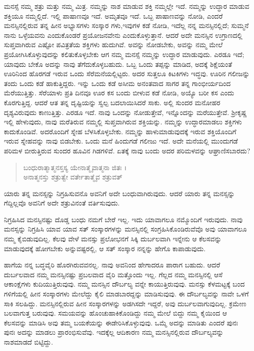ಮನಸ್ಸೆ ನಮ್ಮ ಶತ್ರು ಮತ್ತು ನಮ್ಮ ಮಿತ್ರ. ನಮ್ಮನ್ನು ನಾಶ ಮಾಡುವ ಶಕ್ತಿ ನಮ್ಮಲ್ಲೇ ಇದೆ. ನಮ್ಮನ್ನು ಉದ್ಧಾರ ಮಾಡುವ ಶಕ್ತಿಯೂ ನಮ್ಮಲ್ಲಿದೆ. ಇಲ್ಲಿ ಪಾಷಾಣವೂ ಇದೆ. ಅಮೃತವೂ ಇದೆ. ಒಬ್ಬ ಪಾಷಾಣವನ್ನು ನೋಡಿ, ಎಂದರೆ ಮನಸ್ಸಿನಲ್ಲಿರುವ ತನ್ನ ಹೀನ ಅಭ್ಯಾಸಗಳು ಸಂಸ್ಕಾರ ಗಳು,ಇವುಗಳ ಕಡೆ ನೋಡಿ, ಇದೆಲ್ಲ ನನ್ನ ಮನಸ್ಸಿನಲ್ಲಿದೆ; ಸುಮ್ಮನೆ ನಾನು ಒಳ್ಳೆಯವನು ಎಂದುಕೊಂಡರೆ ಪ್ರಯೋಜನವೇನು ಎಂದುಕೊಳ್ಳುತ್ತಾನೆ. ಆದರೆ ಅದೇ ಮನಸ್ಸಿನ ಉಗ್ರಾಣದಲ್ಲಿ ಸುಪ್ತವಾಗಿರುವ ಎಷ್ಟೋ ಪವಿತ್ರತೆಯ ಶಕ್ತಿಗಳು ಹುದುಗಿವೆ. ಅವನ್ನು ನೋಡಬೇಕು, ಅವನ್ನು ನಮ್ಮ ಮೇಲೆ ಪ್ರಯೋಗಿಸಿಕೊಳ್ಳುವುದನ್ನು ಕಲಿತುಕೊಳ್ಳಬೇಕು ಆಗ ನಮ್ಮ ಮನಸ್ಸೆ ನಮ್ಮನ್ನು ಉದ್ಧಾರ ಮಾಡುವುದು. ಎರಡೂ ಇದೆ; ಯಾವುದು ಬೇಕೊ ಅದನ್ನು ನಾವು ತೆಗೆದುಕೊಳ್ಳಬಹುದು. ಒಬ್ಬ ಒಂದು ತಪ್ಪನ್ನು ಮಾಡಿದ, ಅದಕ್ಕೆ ಶಿಕ್ಷೆಯಂತೆ ಊರಿನಿಂದ ಹೊರಗಡೆ ಇರುವ ಒಂದು ಸೆರೆಮನೆಯಲ್ಲಿಟ್ಟರು. ಅದರ ಸುತ್ತಲೂ ಕಿಟಕಿಗಳು ಇದ್ಧವು. ಊರಿನ ಗಲೀಜನ್ನು ತಂದು ಒಂದು ಕಡೆ ಹಾಕುತ್ತಿದ್ದರು. ಇನ್ನು ಒಂದು ಕಡೆ ಅಸೀಮ ಅನಂತವಾದ ಸಾಗರ ತನ್ನ ಗಾಂಭೀರ್ಯದಿಂದ ಮೆರೆಯುತ್ತಿತ್ತು. ಸೆರೆಯಾಳು ಪ್ರತಿ ದಿನವೂ ಊರ ಕಸ ಬಂದು ಬೀಳುವ ಕಡೆ ನೋಡಿ, ಅಯ್ಯೊ ಬರೀ ಕಸ ಎಂದು ಕೊರಗುತ್ತಿದ್ದ. ಆದರೆ ಆತ ತನ್ನ ದೃಷ್ಟಿಯನ್ನು ಸ್ವಲ್ಪ ಬದಲಾಯಿಸಿದರೆ ಸಾಕು. ಅಲ್ಲಿ ಸುಂದರ ಮನೋಹರ ದೃಶ್ಯವಿರುವುದು ಕಾಣುತ್ತಿತ್ತು. ಎರಡೂ ಇದೆ. ನಾವು ಒಂದನ್ನು ನೋಡುತ್ತೇವೆ, ಇನ್ನೊಂದನ್ನು ಮರೆಯುತ್ತೇವೆ. ಶ್ರೀಕೃಷ್ಣ ಇಲ್ಲಿ ಹೇಳುವುದು, ನಾವು ಮರೆತಿರುವ ನಮ್ಮಲ್ಲಿ ಸುಪ್ತವಾಗಿರುವ ಶಕ್ತಿಯನ್ನು. ನಮ್ಮನ್ನು ಉದ್ಧಾರಮಾಡಲು ಶಕ್ತಿಗಳು ಕಾದುಕೊಂಡಿವೆ. ಅದರೊಂದಿಗೆ ಸ್ನೇಹ ಬೆಳಸಿಕೊಳ್ಳಬೇಕು. ನಮ್ಮನ್ನು ಹಾಳುಮಾಡುವುದಕ್ಕೆ ಇರುವ ಶಕ್ತಿಯೊಂದಿಗೆ ಇರುವ ಸ್ನೇಹವನ್ನು ನಾವು ಬಿಡಬೇಕು. ಒಂದು ಮನೆ ಹಿಂದುಗಡೆ ಗಲೀಜು ಇದೆ. ಅದೇ ಮನೆಯಲ್ಲಿ ಮುಂದುಗಡೆ ಪರಿಮಳ ಬೀರುತ್ತಿರುವ ಸುಂದರ ಹೂವಿನ ಗಿಡಗಳಿವೆ. ಏತಕ್ಕೆ ನಾವು ಬಂದು ಅದರ ಪರಿಮಳವನ್ನು ಆಘ್ರಾಣಿಸಬಾರದು?

\begin{verse}
ಬಂಧುರಾತ್ಮಾತ್ಮನಸ್ತಸ್ಯ ಯೇನಾತ್ಮೈವಾತ್ಮನಾ ಜಿತಃ ।\\ಅನಾತ್ಮನಸ್ತು ಶತ್ರುತ್ವೇ ವರ್ತೇತಾತ್ಮೈವ ಶತ್ರುವತ್ 
\end{verse}

{\small ಯಾರು ತನ್ನ ಮನಸ್ಸನ್ನು ನಿಗ್ರಹಿಸುವನೊ ಅವನಿಗೆ ಅದೇ ಬಂಧುವಾಗಿರುವುದು. ಆದರೆ ಯಾರು ತನ್ನ ಮನಸ್ಸನ್ನು ಗೆದ್ದಿಲ್ಲವೊ ಅವನಿಗೆ ಅದೇ ಶತ್ರುವಿನಂತೆ ವರ್ತಿಸುವುದು.}

ನಿಗ್ರಹಿಸಿದ ಮನಸ್ಸಿನಷ್ಟು ದೊಡ್ಡ ಬಂಧು ನಮಗೆ ಬೇರೆ ಇಲ್ಲ. ಇದು ಯಾವಾಗಲೂ ನಮ್ಮೊಂದಿಗೆ ಇರುವುದು. ನಾವು ಮನಸ್ಸನ್ನು ನಿಗ್ರಹಿಸಿ ಯಾವ ಯಾವ ಸತ್ ಸಂಸ್ಕಾರಗಳನ್ನು ಮನಸ್ಸಿನಲ್ಲಿ ಸಂಗ್ರಹಿಸಿಕೊಂಡಿರುವೆವೊ ಅವು ಯಾವಾಗಲೂ ನಮ್ಮ ಕೈಬಿಡುವುದಿಲ್ಲ. ಕೆಲವು ವೇಳೆ ಮನಸ್ಸು ಪ್ರಲೋಭನಗೆ ಸಿಕ್ಕಿ ದುರ್ಬಲವಾಗಿ ಇನ್ನೇನು ಆ ಕೆಲಸವನ್ನು ಮಾಡುವುದಕ್ಕೆ ಹೋಗಬೇಕು ಅನ್ನುವಷ್ಟರಲ್ಲಿ, ಆ ಸತ್ ಸಂಸ್ಕಾರ ನನ್ನನ್ನು ಹೇಗೊ ಕಾಪಾಡುವುದು.

ಹಾಗೆಯ ನನ್ನ ಬದ್ಧವೈರಿ ಹೊರಗಿರುವವನಲ್ಲ. ನಾವು ಅವನಿಂದ ಹೇಗಾದರೂ ಪಾರಾಗ ಬಹುದು. ಆದರೆ ದುರ್ಬಲವಾದ ನಮ್ಮ ಮನಸ್ಸಿನಷ್ಟು ಪ್ರಬಲವಾದ ವೈರಿ ಮತ್ತೊಂದು ಇಲ್ಲ. ಗೆಲ್ಲದ ನಮ್ಮ ಮನಸ್ಸಿನಲ್ಲಿ ಆಸೆ ಆಕಾಂಕ್ಷೆಗಳು ಕುದಿಯುತ್ತಿರುವುವು. ನಮ್ಮ ಮನಸ್ಸಿನ ದೌರ್ಬಲ್ಯ ವನ್ನೇ ಕಾಯುತ್ತಿರುವುವು. ಮನಸ್ಸು ಕೆಳಮಟ್ಟಕ್ಕೆ ಬಂದ ಗಳಿಗೆಯಲ್ಲಿ ಹೀನ ಸಂಸ್ಕಾರಗಳು ಮೇಲೆದ್ದು ಕೈಲಿ ಮಾಡಬಾರದ್ದನ್ನು ಮಾಡಿಸುವುವು. ಈ ದೌರ್ಬಲ್ಯವನ್ನು ನಾವೇ ಒಳಗೆ ಸಾಕಿ ಸಲಹಿದ್ದು. ಮನಸ್ಸಿನಲ್ಲಿರುವ ಹೀನ ಸಂಸ್ಕಾರಗಳನ್ನು ಅಡಗಿಸದೇ ಇದ್ದರೆ, ಅವು ದುರ್ಬಲವಾಗುವುದಿಲ್ಲ. ಕ್ರಮೇಣ ಬಲವಾಗುತ್ತ ಬರುವುವು. ಸಮಯವನ್ನು ಹೊಂಚುಹಾಕಿಕೊಂಡಿದ್ದು ನಮ್ಮ ಮೇಲೆ ಬಿದ್ದು ನಮ್ಮ ಕೈಯಿಂದ ಆ ಕೆಲಸವನ್ನು ಮಾಡಿಸಿ ಅವು ತಮ್ಮ ಬಯಕೆಯನ್ನು ಈಡೇರಿಸಿಕೊಳ್ಳುವುವು. ಒಮ್ಮೆ ಅದನ್ನು ಮಾಡಿತು ಎಂದರೆ ಪುನಃ ಪುನಃ ಅದನ್ನು ಮಾಡಲು ಪ್ರಾರಂಭಿಸುವೆವು. ಇದಕ್ಕೆಲ್ಲ ಆದಿಕಾರಣ ನಮ್ಮ ಮನಸ್ಸಿನಲ್ಲಿರುವ ದೌರ್ಬಲ್ಯವನ್ನು ನಾಶಮಾಡದೆ ಬಿಟ್ಟಿದ್ದು.


